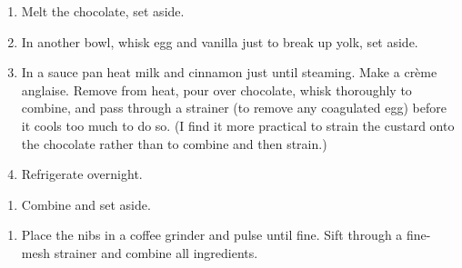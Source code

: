 \begin{recipe}
  \begin{enumerate}

  \item Melt the chocolate, set aside.

  \item In another bowl, whisk egg and vanilla just to break up yolk, set aside.

  \item In a sauce pan heat milk and cinnamon just until steaming.
    Make a crème anglaise.  Remove from heat, pour over chocolate,
    whisk thoroughly to combine, and pass through a strainer (to
    remove any coagulated egg) before it cools too much to do so.  (I
    find it more practical to strain the custard onto the chocolate
    rather than to combine and then strain.)

  \item Refrigerate overnight.

  \end{enumerate}
\end{recipe}



\begin{ingredients}
\end{ingredients}

\begin{recipe}
  \begin{enumerate}

  \item Combine and set aside.

  \end{enumerate}
\end{recipe}



\begin{ingredients}
\end{ingredients}

\begin{recipe}
  \begin{enumerate}

  \item Place the nibs in a coffee grinder and pulse until fine.  Sift
    through a fine-mesh strainer and combine all ingredients.

  \end{enumerate}
\end{recipe}

